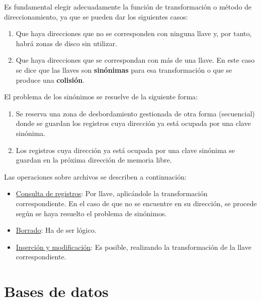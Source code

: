 Es fundamental elegir adecuadamente la {función de transformación} o {método de} {direccionamiento}, ya que se pueden dar los siguientes casos:
\begin{enumerate}
    \item Que haya direcciones que no se corresponden con ninguna llave y, por tanto, habrá zonas de disco sin utilizar.

    \item Que haya direcciones que se correspondan con más de una llave. En este caso se dice que las llaves son \textbf{sinónimas} para esa transformación o que se produce una \textbf{colisión}.
\end{enumerate}

El problema de los sinónimos se resuelve de la siguiente forma:
\begin{enumerate}
    \item Se reserva una zona de desbordamiento gestionada de otra forma (secuencial) donde se guardan los registros cuya dirección ya está ocupada por una clave sinónima.

    \item Los registros cuya dirección ya está ocupada por una clave sinónima se guardan en la próxima dirección de memoria libre.
\end{enumerate}

Las operaciones sobre archivos se describen a continuación:
\begin{itemize}
    \item \underline{Consulta de registros}: Por llave, aplicándole la transformación correspondiente. En el caso de que no se encuentre en su dirección, se procede según se haya resuelto el problema de sinónimos.
    
    \item \underline{Borrado}: Ha de ser lógico.
    
    \item \underline{Inserción y modificación}: Es posible, realizando la transformación de la llave correspondiente.
\end{itemize}



\section{Bases de datos}

